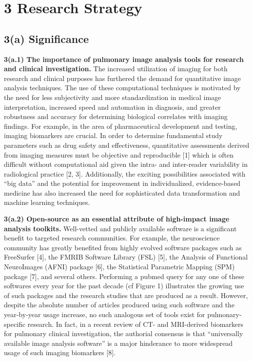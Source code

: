 \documentclass[11pt,]{article}
\begin{document}
\newpage

\section{3 Research Strategy}\label{research-strategy}

\subsection{\textbf{3(a) Significance}}\label{a-significance}

\textbf{3(a.1) The importance of pulmonary image analysis tools for
research and clinical investigation.} The increased utilization of
imaging for both research and clinical purposes has furthered the demand
for quantitative image analysis techniques. The use of these
computational techniques is motivated by the need for less subjectivity
and more standardization in medical image interpretation, increased
speed and automation in diagnosis, and greater robustness and accuracy
for determining biological correlates with imaging findings. For
example, in the area of pharmaceutical development and testing, imaging
biomarkers are crucial. In order to determine fundamental study
parameters such as drug safety and effectiveness, quantitative
assessments derived from imaging measures must be objective and
reproducible {[}1{]} which is often difficult without computational aid
given the intra- and inter-reader variability in radiological practice
{[}2, 3{]}. Additionally, the exciting possibilities associated with
``big data'' and the potential for improvement in individualized,
evidence-based medicine has also increased the need for sophisticated
data transformation and machine learning techniques.

\textbf{3(a.2) Open-source as an essential attribute of high-impact
image analysis toolkits.} Well-vetted and publicly available software is
a significant benefit to targeted research communities. For example, the
neuroscience community has greatly benefited from highly evolved
software packages such as FreeSurfer {[}4{]}, the FMRIB Software Library
(FSL) {[}5{]}, the Analysis of Functional NeuroImages (AFNI) package
{[}6{]}, the Statistical Parametric Mapping (SPM) package {[}7{]}, and
several others. Performing a pubmed query for any one of these softwares
every year for the past decade (cf Figure 1) illustrates the growing use
of such packages and the research studies that are produced as a result.
However, despite the absolute number of articles produced using such
software and the year-by-year usage increase, no such analogous set of
tools exist for pulmonary-specific research. In fact, in a recent review
of CT- and MRI-derived biomarkers for pulmonary clinical investigation,
the authorial consensus is that ``universally available image analysis
software'' is a major hinderance to more widespread usage of such
imaging biomarkers {[}8{]}.
\end{document}
